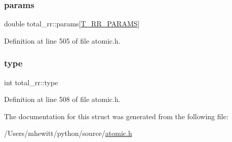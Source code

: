 \subsubsection{\texorpdfstring{params}{params}}
{\footnotesize\ttfamily double total\+\_\+rr\+::params\mbox{[}\hyperlink{atomic_8h_ae16cfc189f4a79641132b7f359cafbef}{T\+\_\+\+R\+R\+\_\+\+P\+A\+R\+A\+MS}\mbox{]}}



Definition at line 505 of file atomic.\+h.

\mbox{\label{structtotal__rr_af555b9f91044fdf1bf9c0203c2408d0e}} 
\subsubsection{\texorpdfstring{type}{type}}
{\footnotesize\ttfamily int total\+\_\+rr\+::type}



Definition at line 508 of file atomic.\+h.



The documentation for this struct was generated from the following file\+:\begin{DoxyCompactItemize}
\item 
/\+Users/mhewitt/python/source/\hyperlink{atomic_8h}{atomic.\+h}\end{DoxyCompactItemize}
